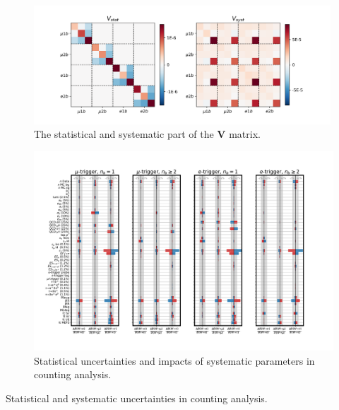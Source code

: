 \begin{figure}[ht]
    \centering
    \includegraphics[width=0.99\textwidth]{chapters/Analysis/sectionSystematics/figures/covarMatrix_total.png}
    \caption{ The statistical and systematic part of the $\textbf{V}$ matrix. }
    \label{fig:corBetaBar}
\end{figure}

\begin{figure}
    \centering
    \includegraphics[width=\textwidth]{chapters/Analysis/sectionSystematics/figures/systematics_impact_counting.pdf}
    \caption{Statistical uncertainties and impacts of systematic parameters in counting analysis.}
    \label{fig:analysis:systematics:pulls_all}
\end{figure}

\begin{table}[ht]
  \renewcommand{\arraystretch}{1.1}
  \setlength{\tabcolsep}{0.4em}
  \centering
  \caption{ Statistical and systematic uncertainties in counting analysis. }
  \resizebox{\textwidth}{!}{}
  \label{tab:syst_alt}
\end{table}







